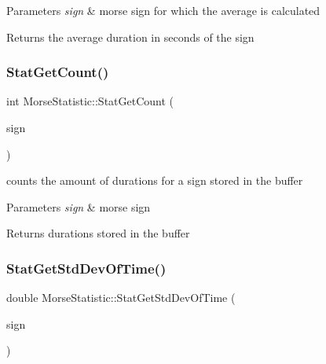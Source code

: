 \begin{DoxyParams}{Parameters}
{\em sign} & morse sign for which the average is calculated \\
\hline
\end{DoxyParams}
\begin{DoxyReturn}{Returns}
the average duration in seconds of the sign 
\end{DoxyReturn}
\mbox{\label{classMorseStatistic_a541c0f03283b2327051bb30e2241753a}} 
\subsubsection{\texorpdfstring{Stat\+Get\+Count()}{StatGetCount()}}
{\footnotesize\ttfamily int Morse\+Statistic\+::\+Stat\+Get\+Count (\begin{DoxyParamCaption}\item[{Morse\+::\+Morse\+Sign}]{sign }\end{DoxyParamCaption})}



counts the amount of durations for a sign stored in the buffer 


\begin{DoxyParams}{Parameters}
{\em sign} & morse sign \\
\hline
\end{DoxyParams}
\begin{DoxyReturn}{Returns}
durations stored in the buffer 
\end{DoxyReturn}
\mbox{\label{classMorseStatistic_af92781be60bdd00871dcb5907939dcb6}} 
\subsubsection{\texorpdfstring{Stat\+Get\+Std\+Dev\+Of\+Time()}{StatGetStdDevOfTime()}}
{\footnotesize\ttfamily double Morse\+Statistic\+::\+Stat\+Get\+Std\+Dev\+Of\+Time (\begin{DoxyParamCaption}\item[{Morse\+::\+Morse\+Sign}]{sign }\end{DoxyParamCaption})}



